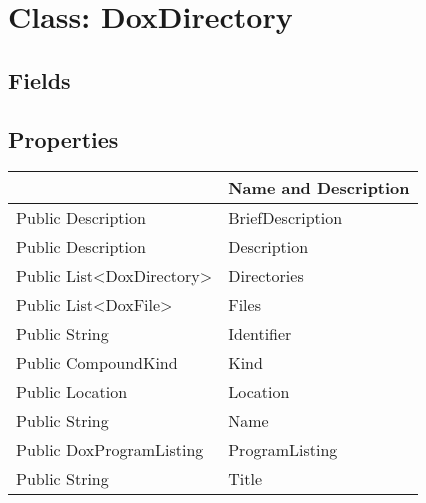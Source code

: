\documentclass[11pt, oneside, a4paper]{book}
\begin{document}
\hypertarget{SoftwareEngineeringTools.{}Documentation.{}DoxDirectory}{}
\section{Class: DoxDirectory}

\subsection{Fields}

\subsection{Properties}
\begin{center}
\begin{tabular}{| p{3cm} | p{12cm} | }
\hline
\textbf{ } & \textbf{ Name and Description}\\
\hline
 Public  Description &  BriefDescription\hypertarget{SoftwareEngineeringTools.{}Documentation.{}DoxDirectory.{}BriefDescription}{}\\
\hline
 Public  Description &  Description\hypertarget{SoftwareEngineeringTools.{}Documentation.{}DoxDirectory.{}Description}{}\\
\hline
 Public  List<DoxDirectory> &  Directories\hypertarget{SoftwareEngineeringTools.{}Documentation.{}DoxDirectory.{}Directories}{}\\
\hline
 Public  List<DoxFile> &  Files\hypertarget{SoftwareEngineeringTools.{}Documentation.{}DoxDirectory.{}Files}{}\\
\hline
 Public  String &  Identifier\hypertarget{SoftwareEngineeringTools.{}Documentation.{}DoxDirectory.{}Identifier}{}\\
\hline
 Public  CompoundKind &  Kind\hypertarget{SoftwareEngineeringTools.{}Documentation.{}DoxDirectory.{}Kind}{}\\
\hline
 Public  Location &  Location\hypertarget{SoftwareEngineeringTools.{}Documentation.{}DoxDirectory.{}Location}{}\\
\hline
 Public  String &  Name\hypertarget{SoftwareEngineeringTools.{}Documentation.{}DoxDirectory.{}Name}{}\\
\hline
 Public  DoxProgramListing &  ProgramListing\hypertarget{SoftwareEngineeringTools.{}Documentation.{}DoxDirectory.{}ProgramListing}{}\\
\hline
 Public  String &  Title\hypertarget{SoftwareEngineeringTools.{}Documentation.{}DoxDirectory.{}Title}{}\\
\hline
\end{tabular}
\end{center}
\end{document}
